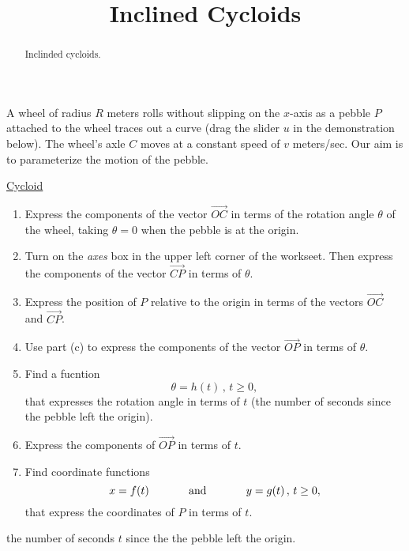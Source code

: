 \documentclass{ximera}
\title{Inclined Cycloids}
\begin{document}
\begin{abstract}
Inclinded cycloids.
\end{abstract}
\maketitle

\begin{exploration}  \label{Exhjjjjnbbbbbr}

A wheel of radius $R$ meters rolls without slipping on the $x$-axis as a pebble $P$ attached to the wheel traces out a curve (drag the slider $u$ in the demonstration below). The wheel's axle $C$ moves  at a constant speed of $v$ meters/sec. Our aim is to parameterize the motion of the pebble.


\href{https://www.geogebra.org/classic/vxbjccpa}{Cycloid}

 
\begin{onlineOnly}
    \begin{center}
\end{center}
\end{onlineOnly}


\begin{enumerate}
\item Express the components of the vector $\overrightarrow{OC}$ in terms of the rotation angle $\theta$ of the wheel, taking $\theta=0$ when the pebble is at the origin.

\item Turn on the \emph{axes} box in the upper left corner of the workseet. Then express the components of the vector $\overrightarrow{CP}$ in terms of $\theta$.

\item Express the position of $P$ relative to the origin in terms of the vectors $\overrightarrow{OC}$ and $\overrightarrow{CP}$.

\item Use part (c) to express the components of the vector $\overrightarrow{OP}$ in terms of $\theta$.

\item Find a fucntion 
\[
   \theta = h(t)  \, , \, t\geq 0, 
\]
that expresses the rotation angle in terms of $t$ (the number of seconds since the pebble left the origin).

\item Express the components of $\overrightarrow{OP}$ in terms of $t$.

\item Find coordinate functions
\[
    x=f(t)   \hskip 0.5in \text{and} \hskip 0.5in y=g(t) \, , \, t\geq 0 ,
\]
that express the coordinates of $P$ in terms of $t$.
\end{enumerate}



the number of seconds $t$ since the the pebble left the origin.

\end{exploration}
\end{document}
